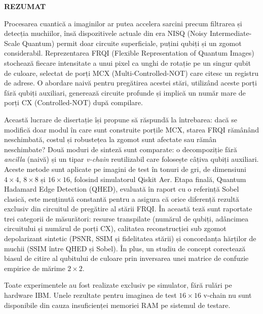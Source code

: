 \thispagestyle{abstractpagestyle}

\vspace*{36pt}

\begin{center}
\textbf{\fontsize{20pt}{24pt} \selectfont REZUMAT}
\end{center}

\vspace{24pt}

Procesarea cuantică a imaginilor ar putea accelera sarcini precum filtrarea și detecția muchiilor, însă dispozitivele actuale din era NISQ (Noisy Intermediate-Scale Quantum) permit doar circuite superficiale, puțini qubiți și un zgomot considerabil. Reprezentarea FRQI (Flexible Representation of Quantum Images) stochează fiecare intensitate a unui pixel ca unghi de rotație pe un singur qubit de culoare, selectat de porți MCX (Multi-Controlled-NOT) care citesc un registru de adrese. O abordare naivă pentru pregătirea acestei stări, utilizând aceste porți fără qubiți auxiliari, generează circuite profunde și implică un număr mare de porți CX (Controlled-NOT) după compilare.

Această lucrare de disertație își propune să răspundă la întrebarea: dacă se modifică doar modul în care sunt construite porțile MCX, starea FRQI rămânând neschimbată, costul și robustețea la zgomot sunt afectate sau rămân neschimbate? Două moduri de sinteză sunt comparate: o decompoziție fără \emph{ancilla} (naivă) și un tipar \emph{v-chain} reutilizabil care folosește câțiva qubiți auxiliari. Aceste metode sunt aplicate pe imagini de test în tonuri de gri, de dimensiuni $4\times 4$, $8\times 8$ și $16\times 16$, folosind simulatorul Qiskit Aer. Etapa finală, Quantum Hadamard Edge Detection (QHED), evaluată în raport cu o referință Sobel clasică, este menținută constantă pentru a asigura că orice diferență rezultă exclusiv din circuitul de pregătire al stării FRQI. În această teză sunt raportate trei categorii de măsurători: resurse transpilate (numărul de qubiți, adâncimea circuitului și numărul de porți CX), calitatea reconstrucției sub zgomot depolarizant sintetic (PSNR, SSIM și fidelitatea stării) și concordanța hărților de muchii (SSIM între QHED și Sobel). În plus, un studiu de concept corectează biasul de citire al qubitului de culoare prin inversarea unei matrice de confuzie empirice de mărime $2\times 2$.

Toate experimentele au fost realizate exclusiv pe simulator, fără rulări pe hardware IBM. Unele rezultate pentru imaginea de test $16\times 16$ v-chain nu sunt disponibile din cauza insuficienței memoriei RAM pe sistemul de testare.

\vfill
